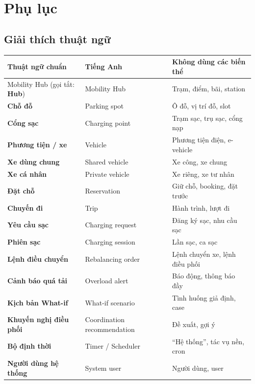 \newpage
\section{Phụ lục}
\subsection{Giải thích thuật ngữ}

\begin{longtable}{|
  >{\raggedright\arraybackslash}p{\dimexpr(\linewidth - 6\tabcolsep - 4\arrayrulewidth)/3\relax}|
  >{\raggedright\arraybackslash}p{\dimexpr(\linewidth - 6\tabcolsep - 4\arrayrulewidth)/3\relax}|
  >{\raggedright\arraybackslash}p{\dimexpr(\linewidth - 6\tabcolsep - 4\arrayrulewidth)/3\relax}|}
\hline
\textbf{Thuật ngữ chuẩn} & \textbf{Tiếng Anh} & \textbf{Không dùng các biến thể} \\
\hline
\endhead
\hline
\endfoot
\hline
\endlastfoot

Mobility Hub (gọi tắt: \textbf{Hub}) & Mobility Hub & Trạm, điểm, bãi, station \\ \hline
\textbf{Chỗ đỗ} & Parking spot & Ô đỗ, vị trí đỗ, slot \\ \hline
\textbf{Cổng sạc} & Charging point & Trạm sạc, trụ sạc, cổng nạp \\ \hline
\textbf{Phương tiện / xe} & Vehicle & Phương tiện điện, e-vehicle \\ \hline
\textbf{Xe dùng chung} & Shared vehicle & Xe công, xe chung \\ \hline
\textbf{Xe cá nhân} & Private vehicle & Xe riêng, xe tư nhân \\ \hline
\textbf{Đặt chỗ} & Reservation & Giữ chỗ, booking, đặt trước \\ \hline
\textbf{Chuyến đi} & Trip & Hành trình, lượt đi \\ \hline
\textbf{Yêu cầu sạc} & Charging request & Đăng ký sạc, nhu cầu sạc \\ \hline
\textbf{Phiên sạc} & Charging session & Lần sạc, ca sạc \\ \hline
\textbf{Lệnh điều chuyển} & Rebalancing order & Lệnh chuyển xe, lệnh
điều phối \\ \hline
\textbf{Cảnh báo quá tải} & Overload alert & Báo động, thông báo đầy \\ \hline
\textbf{Kịch bản What-if} & What-if scenario & Tình huống giả định,
case \\ \hline
\textbf{Khuyến nghị điều phối} & Coordination recommendation & Đề xuất,
gợi ý \\ \hline
\textbf{Bộ định thời} & Timer / Scheduler & ``Hệ thống'', tác vụ nền,
cron \\ \hline
\textbf{Người dùng hệ thống} & System user & Người dùng, user \\ 

\end{longtable}



